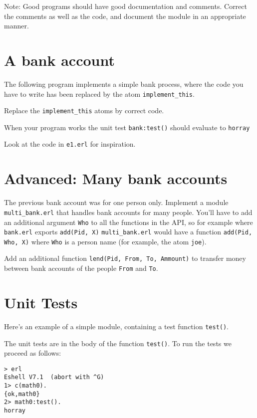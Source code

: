 \documentclass[12pt]{hitec}
\begin{document}
Note: Good programs should have good documentation and
comments. Correct the comments as well as the code, and document the
module in an appropriate manner.



\section{A bank account}

The following program implements a simple bank process, where the code
you have to write has been replaced by the atom \verb+implement_this+.

Replace the \verb+implement_this+ atoms by correct code. 


When your program works the unit test \verb+bank:test()+ should
evaluate to \verb+horray+

Look at the code in \verb+e1.erl+ for inspiration.


\section{Advanced: Many bank accounts}

The previous bank account was for one person only. Implement a module
\verb+multi_bank.erl+ that handles bank accounts for many
people. You'll have to add an additional argument \verb+Who+ to all
the functions in the API, so for example where \verb+bank.erl+ exports
\verb+add(Pid, X)+ \verb+multi_bank.erl+ would have a function
\verb+add(Pid, Who, X)+ where \verb+Who+ is a person name (for example, the
atom \verb+joe+).

Add an additional function \verb+lend(Pid, From, To, Ammount)+ to
transfer money between bank accounts of the people \verb+From+ and \verb+To+.

\section{Unit Tests}

Here's an example of a simple module, containing a test function \verb+test()+.


The unit tests are in the body of the function \verb+test()+. To run the tests
we proceed as follows:

\begin{verbatim}
> erl
Eshell V7.1  (abort with ^G)
1> c(math0).
{ok,math0}
2> math0:test().
horray
\end{verbatim}
\end{document}
